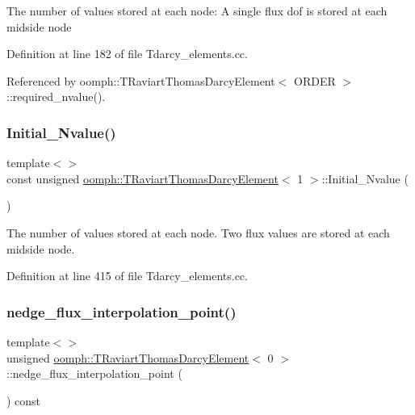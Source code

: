 The number of values stored at each node\+: A single flux dof is stored at each midside node 

Definition at line 182 of file Tdarcy\+\_\+elements.\+cc.



Referenced by oomph\+::\+T\+Raviart\+Thomas\+Darcy\+Element$<$ O\+R\+D\+E\+R $>$\+::required\+\_\+nvalue().

\mbox{\label{classoomph_1_1TRaviartThomasDarcyElement_a957b3a77d11af9264a82488bff00b493}} 
\subsubsection{\texorpdfstring{Initial\+\_\+\+Nvalue()}{Initial\_Nvalue()}\hspace{0.1cm}{\footnotesize\ttfamily [2/2]}}
{\footnotesize\ttfamily template$<$$>$ \\
const unsigned \hyperlink{classoomph_1_1TRaviartThomasDarcyElement}{oomph\+::\+T\+Raviart\+Thomas\+Darcy\+Element}$<$ 1 $>$\+::Initial\+\_\+\+Nvalue (\begin{DoxyParamCaption}{ }\end{DoxyParamCaption})\hspace{0.3cm}{\ttfamily [protected]}}

The number of values stored at each node. Two flux values are stored at each midside node. 

Definition at line 415 of file Tdarcy\+\_\+elements.\+cc.

\mbox{\label{classoomph_1_1TRaviartThomasDarcyElement_a7c515fbe4bb25c8c67565fb1584f7f6b}} 
\subsubsection{\texorpdfstring{nedge\+\_\+flux\+\_\+interpolation\+\_\+point()}{nedge\_flux\_interpolation\_point()}\hspace{0.1cm}{\footnotesize\ttfamily [1/3]}}
{\footnotesize\ttfamily template$<$$>$ \\
unsigned \hyperlink{classoomph_1_1TRaviartThomasDarcyElement}{oomph\+::\+T\+Raviart\+Thomas\+Darcy\+Element}$<$ 0 $>$\+::nedge\+\_\+flux\+\_\+interpolation\+\_\+point (\begin{DoxyParamCaption}{ }\end{DoxyParamCaption}) const\hspace{0.3cm}{\ttfamily [virtual]}}


